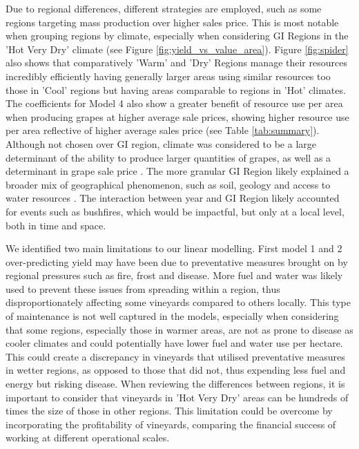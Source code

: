 \documentclass[review,12pt,authoryear]{elsarticle}
\begin{document}
\begin{linenumbers}
\par
Due to regional differences, different strategies are  employed, such as some regions targeting mass production over higher sales price. This is most notable when grouping regions by climate, especially when considering GI Regions in the 'Hot Very Dry' climate (see Figure \ref{fig:yield_vs_value_area}). Figure \ref{fig:spider} also shows that comparatively 'Warm' and 'Dry' Regions manage their resources incredibly efficiently having generally larger areas using similar resources too those in 'Cool' regions but having areas comparable to regions in 'Hot' climates. The coefficients for Model 4 also show a greater benefit of resource use per area when producing grapes at higher average sale prices, showing higher resource use per area reflective of higher average sales price (see Table \ref{tab:summary}).
Although not chosen over GI region, climate was considered to be a large determinant of the ability to produce larger quantities of grapes, as well as a determinant in grape sale price \citep{agostaRegionalClimateVariability2012}. The more granular GI Region likely explained a broader mix of geographical phenomenon, such as soil, geology and access to water resources \citep{abbalDecisionSupportSystem2016,carmonaUseParticipatoryObjectOriented2011}. The interaction between year and GI Region likely accounted for events such as bushfires, which would be impactful, but only at a local level, both in time and space.
\par
We identified two main limitations to our linear modelling. First model 1 and 2 over-predicting yield may have been due to preventative measures brought on by regional pressures such as fire, frost and disease. More fuel and water was likely used to prevent these issues from spreading within a region, thus disproportionately affecting some vineyards compared to others locally. This type of maintenance is not well captured in the models, especially when considering that some regions, especially those in warmer areas, are not as prone to disease as cooler climates and could potentially have lower fuel and water use per hectare. This could create a discrepancy in vineyards that utilised preventative measures in wetter regions, as opposed to those that did not, thus expending less fuel and energy but risking disease. When reviewing the differences between regions, it is important to consider that vineyards in 'Hot Very Dry' areas can be hundreds of times the size of those in other regions. This limitation could be overcome by incorporating the profitability of vineyards, comparing the financial success of working at different operational scales.

\end{linenumbers}
\end{document}
